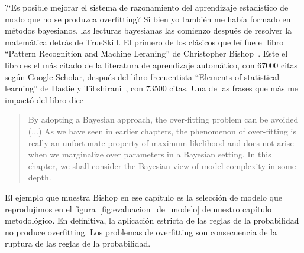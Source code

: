 \documentclass[a4paper,11pt]{book}
\theoremstyle{definition}
\begin{document}
?`Es posible mejorar el sistema de razonamiento del aprendizaje estad\'istico de modo que no se produzca overfitting?
%
Si bien yo tambi\'en me hab\'ia formado en m\'etodos bayesianos, las lecturas bayesianas las comienzo despu\'es de resolver la matem\'atica detr\'as de TrueSkill.
%
El primero de los cl\'asicos que le\'i fue el libro ``Pattern Recognition and Machine Leraning'' de Christopher Bishop~\cite{Bishop2006}.
%
Este el libro es el m\'as citado de la literatura de aprendizaje autom\'atico, con 67000 citas seg\'un Google Scholar, despu\'es del libro frecuentista ``Elements of statistical learning'' de Hastie y Tibshirani~\cite{hastie2009-elements}, con 73500 citas.
%
Una de las frases que m\'as me impact\'o del libro dice
%
\begin{quotation}
By adopting a Bayesian approach, the over-fitting problem can be avoided (...) As we have seen in earlier chapters, the phenomenon of over-fitting is really an unfortunate property of maximum likelihood and does not arise when we marginalize over parameters in a Bayesian setting. In this chapter, we shall consider the Bayesian view of model complexity in some depth.
\end{quotation}
%
El ejemplo que muestra Bishop en ese cap\'itulo es la selecci\'on de modelo que reprodujimos en el figura~\ref{fig:evaluacion_de_modelo} de nuestro cap\'itulo metodol\'ogico.
%
En definitiva, la aplicaci\'on estricta de las reglas de la probabilidad no produce overfitting.
%
Los problemas de overfitting son consecuencia de la ruptura de las reglas de la probabilidad.

\end{document}
